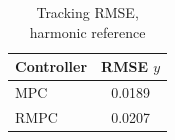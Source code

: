 \begin{table}[t]
\centering
\caption{Tracking RMSE, harmonic reference}
\label{tab:rmse_duffing_harmonic_mpc_rmpc}
\begin{tabular}{lc}
\toprule
Controller & RMSE $y$ \\
\midrule
MPC & 0.0189 \\
RMPC & 0.0207 \\
\bottomrule
\end{tabular}
\end{table}
